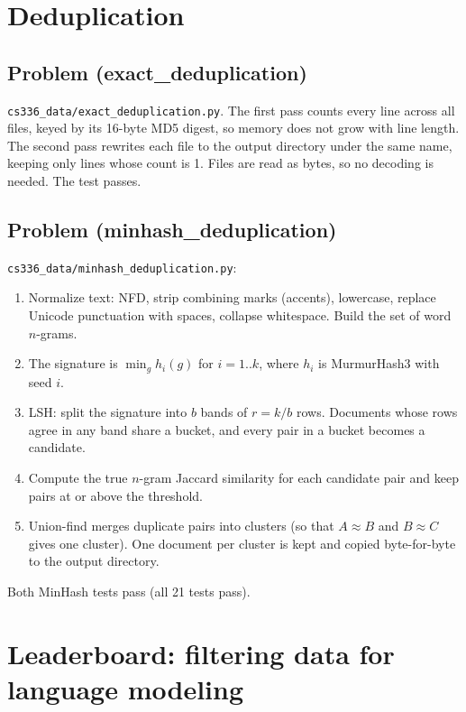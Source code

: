 \documentclass[11pt]{article}
\begin{document}
\section{Deduplication}

\subsection*{Problem (exact\_deduplication)}
\texttt{cs336\_data/exact\_deduplication.py}. The first pass counts every line across all files,
keyed by its 16-byte MD5 digest, so memory does not grow with line length. The second pass
rewrites each file to the output directory under the same name, keeping only lines whose
count is 1. Files are read as bytes, so no decoding is needed. The test passes.

\subsection*{Problem (minhash\_deduplication)}
\texttt{cs336\_data/minhash\_deduplication.py}:
\begin{enumerate}
  \item Normalize text: NFD, strip combining marks (accents), lowercase, replace Unicode
  punctuation with spaces, collapse whitespace. Build the set of word $n$-grams.
  \item The signature is $\min_g h_i(g)$ for $i=1..k$, where $h_i$ is MurmurHash3 with seed $i$.
  \item LSH: split the signature into $b$ bands of $r=k/b$ rows. Documents whose rows agree in
  any band share a bucket, and every pair in a bucket becomes a candidate.
  \item Compute the true $n$-gram Jaccard similarity for each candidate pair and keep pairs at or above the threshold.
  \item Union-find merges duplicate pairs into clusters (so that $A\approx B$ and $B\approx C$ gives one cluster). One
  document per cluster is kept and copied byte-for-byte to the output directory.
\end{enumerate}
Both MinHash tests pass (all 21 tests pass).

\section{Leaderboard: filtering data for language modeling}
\end{document}
